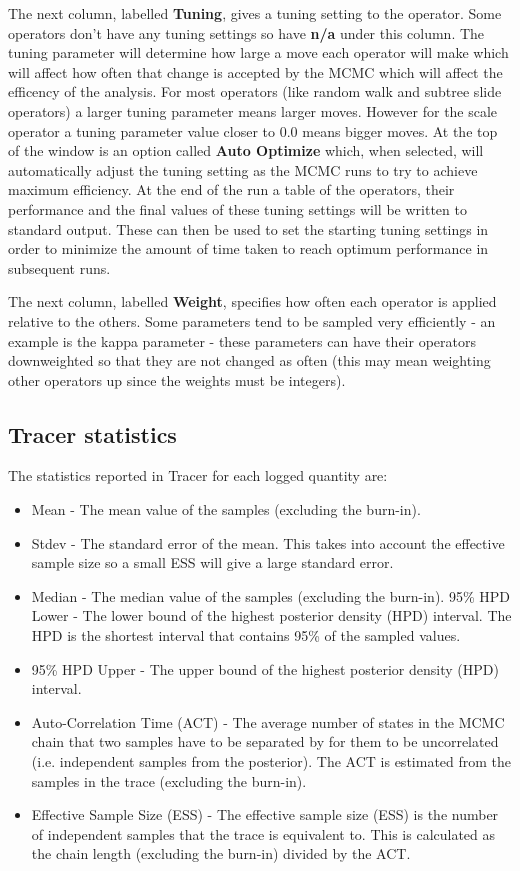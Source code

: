\documentclass[11pt]{article}
\theoremstyle{plain}%
\theoremstyle{definition}
\theoremstyle{remark}
\begin{document}
The next column, labelled {\bf Tuning}, gives a tuning setting to the operator. Some operators don't have any tuning settings so
have {\bf n/a} under this column. The tuning parameter will determine how large a move each operator will make which will affect
how often that change is accepted by the MCMC which will affect the efficency of the analysis. For most operators (like
random walk and subtree slide operators) a larger tuning parameter means larger moves. However for the scale operator a
tuning parameter value closer to 0.0 means bigger moves. At the top of the window is an option called {\bf Auto Optimize}
which, when selected, will automatically adjust the tuning setting as the MCMC runs to try to achieve maximum efficiency. At
the end of the run a table of the operators, their performance and the final values of these tuning settings will be written to
standard output. These can then be used to set the starting tuning settings in order to minimize the amount of time taken to
reach optimum performance in subsequent runs.

The next column, labelled {\bf Weight}, specifies how often each operator is applied relative to the others. Some parameters
tend to be sampled very efficiently - an example is the kappa parameter - these parameters can have their operators downweighted
so that they are not changed as often (this may mean weighting other operators up since the weights must be
integers).
\fi

\subsection*{Tracer statistics}

The statistics reported in Tracer for each logged quantity are:

\begin{itemize}
\item Mean - The mean value of the samples (excluding the burn-in).
\item Stdev - The standard error of the mean. This takes into account the effective sample size so a small ESS will give a large
standard error.
\item Median - The median value of the samples (excluding the burn-in).
95\% HPD Lower - The lower bound of the highest posterior density (HPD) interval. The HPD is the shortest interval that
contains 95\% of the sampled values.
\item 95\% HPD Upper - The upper bound of the highest posterior density (HPD) interval.
\item Auto-Correlation Time (ACT) - The average number of states in the MCMC chain that two samples have to be separated
by for them to be uncorrelated (i.e. independent samples from the posterior). The ACT is estimated from the samples in the
trace (excluding the burn-in).
\item Effective Sample Size (ESS) - The effective sample size (ESS) is the number of independent samples that the trace is
equivalent to. This is calculated as the chain length (excluding the burn-in) divided by the ACT.
\end{itemize}
\end{document}
